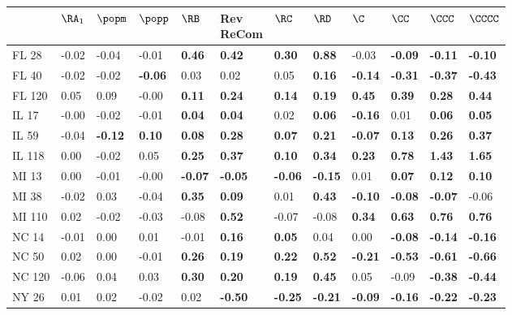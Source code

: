 \begin{tabular}{llllllllllll}
\toprule
 & $\RA_1$ & $\popm$ & $\popp$ & $\RB$ & \makecell{Rev \\ ReCom} & $\RC$ & $\RD$ & $\C$ & $\CC$ & $\CCC$ & $\CCCC$ \\
\midrule
FL 28 & -0.02 & -0.04 & -0.01 & \textbf{0.46} & \textbf{0.42} & \textbf{0.30} & \textbf{0.88} & -0.03 & \textbf{-0.09} & \textbf{-0.11} & \textbf{-0.10} \\
FL 40 & -0.02 & -0.02 & \textbf{-0.06} & 0.03 & 0.02 & 0.05 & \textbf{0.16} & \textbf{-0.14} & \textbf{-0.31} & \textbf{-0.37} & \textbf{-0.43} \\
FL 120 & 0.05 & 0.09 & -0.00 & \textbf{0.11} & \textbf{0.24} & \textbf{0.14} & \textbf{0.19} & \textbf{0.45} & \textbf{0.39} & \textbf{0.28} & \textbf{0.44} \\
IL 17 & -0.00 & -0.02 & -0.01 & \textbf{0.04} & \textbf{0.04} & 0.02 & \textbf{0.06} & \textbf{-0.16} & 0.01 & \textbf{0.06} & \textbf{0.05} \\
IL 59 & -0.04 & \textbf{-0.12} & \textbf{0.10} & \textbf{0.08} & \textbf{0.28} & \textbf{0.07} & \textbf{0.21} & \textbf{-0.07} & \textbf{0.13} & \textbf{0.26} & \textbf{0.37} \\
IL 118 & 0.00 & -0.02 & 0.05 & \textbf{0.25} & \textbf{0.37} & \textbf{0.10} & \textbf{0.34} & \textbf{0.23} & \textbf{0.78} & \textbf{1.43} & \textbf{1.65} \\
MI 13 & 0.00 & -0.01 & -0.00 & \textbf{-0.07} & \textbf{-0.05} & \textbf{-0.06} & \textbf{-0.15} & 0.01 & \textbf{0.07} & \textbf{0.12} & \textbf{0.10} \\
MI 38 & -0.02 & 0.03 & -0.04 & \textbf{0.35} & \textbf{0.09} & 0.01 & \textbf{0.43} & \textbf{-0.10} & \textbf{-0.08} & \textbf{-0.07} & -0.06 \\
MI 110 & 0.02 & -0.02 & -0.03 & -0.08 & \textbf{0.52} & -0.07 & -0.08 & \textbf{0.34} & \textbf{0.63} & \textbf{0.76} & \textbf{0.76} \\
NC 14 & -0.01 & 0.00 & 0.01 & -0.01 & \textbf{0.16} & \textbf{0.05} & 0.04 & 0.00 & \textbf{-0.08} & \textbf{-0.14} & \textbf{-0.16} \\
NC 50 & 0.02 & 0.00 & -0.01 & \textbf{0.26} & \textbf{0.19} & \textbf{0.22} & \textbf{0.52} & \textbf{-0.21} & \textbf{-0.53} & \textbf{-0.61} & \textbf{-0.66} \\
NC 120 & -0.06 & 0.04 & 0.03 & \textbf{0.30} & \textbf{0.20} & \textbf{0.19} & \textbf{0.45} & 0.05 & -0.09 & \textbf{-0.38} & \textbf{-0.44} \\
NY 26 & 0.01 & 0.02 & -0.02 & 0.02 & \textbf{-0.50} & \textbf{-0.25} & \textbf{-0.21} & \textbf{-0.09} & \textbf{-0.16} & \textbf{-0.22} & \textbf{-0.23} \\

\end{tabular}
